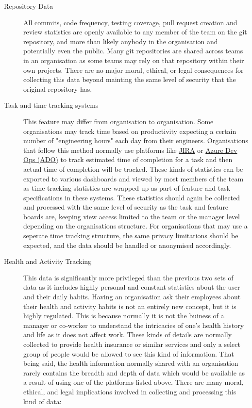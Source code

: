 \documentclass[11pt]{article}
\begin{document}
    \begin{description}
        \item[Repository Data] All commits, code frequency, testing coverage, pull request creation and review statistics are openly available to any member of the team on the git repository, and more than likely anybody in the organisation and potentially even the public. Many git repositories are shared across teams in an organisation as some teams may rely on that repository within their own projects. There are no major moral, ethical, or legal consequences for collecting this data beyond mainting the same level of security that the original repository has. 
        \item[Task and time tracking systems] This feature may differ from organisation to organisation. Some organisations may track time based on productivity expecting a certain number of "engineering hours" each day from their engineers. Organisations that follow this method normally use platforms like \href{https://www.atlassian.com/software/jira}{JIRA} or \href{https://azure.microsoft.com/en-us/services/devops/}{Azure Dev Ops (ADO)} to track estimated time of completion for a task and then actual time of completion will be tracked. These kinds of statistics can be exported to various dashboards and viewed by most members of the team as time tracking statistics are wrapped up as part of feature and task specifications in these systems. These statistics should again be collected and processed with the same level of security as the task and feature boards are, keeping view access limited to the team or the manager level depending on the organisations structure. For organisations that may use a seperate time tracking structure, the same privacy limitations should be expected, and the data should be handled or anonymised accordingly.
        \item[Health and Activity Tracking] This data is significantly more privileged than the previous two sets of data as it includes highly personal and constant statistics about the user and their daily habits. Having an organisation ask their employees about their health and activity habits is not an entirely new concept, but it is highly regulated. This is because normally it is not the buiness of a manager or co-worker to understand the intricacies of one's health history and life as it does not affect work. These kinds of details are normally collected to provide health insurance or similar services and only a select group of people would be allowed to see this kind of information. That being said, the health information normally shared with an organisation rarely contains the breadth and depth of data which would be available as a result of using one of the platforms listed above.  There are many moral, ethical, and legal implications involved in collecting and processing this kind of data:

\end{description}
\end{document}
